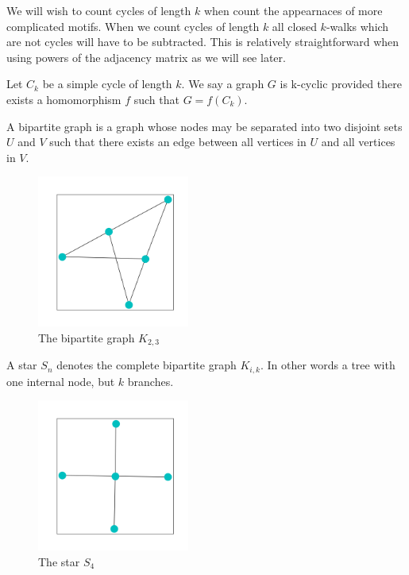 We will wish to count cycles of length $k$ when count the appearnaces of more complicated motifs. When
we count cycles of length $k$ all closed $k$-walks which are not cycles will have to be subtracted. This
is relatively straightforward when using powers of the adjacency matrix as we will see later.

\begin{thm}
    Let $C_k$ be a simple cycle of length $k$. We say a graph $G$ is k-cyclic provided there exists a homomorphism $f$ such that 
    $G = f(C_k)$.
\end{thm}

\begin{dfn}
    A bipartite graph is a graph whose nodes may be separated into two disjoint sets $U$ and $V$
    such that there exists an edge between all vertices in $U$ and all vertices in $V$.
\end{dfn}

\begin{figure}[h!]
    \includegraphics[width=5cm]{Images/Bipartite.png}
    \centering
    \caption{The bipartite graph $K_{2,3}$}
\end{figure}

\FloatBarrier

\begin{dfn}
    A star $S_n$ denotes the complete bipartite graph $K_{i,k}$. In other words 
    a tree with one internal node, but $k$ branches.
\end{dfn}

\begin{figure}[h!]
    \includegraphics[width=5cm]{Images/Star.png}
    \centering
    \caption{The star $S_4$}
\end{figure}

